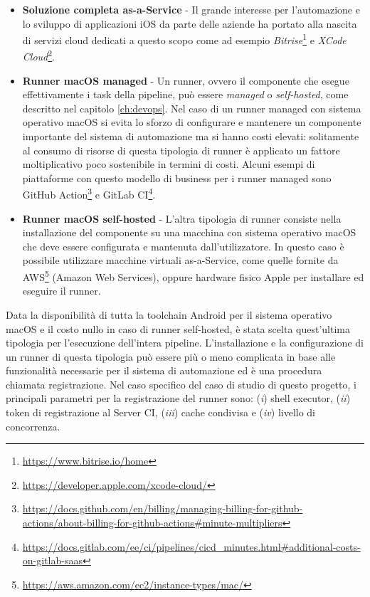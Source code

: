 \begin{itemize}
    \item \textbf{Soluzione completa as-a-Service} - Il grande interesse per l'automazione e lo sviluppo di applicazioni iOS da parte delle aziende ha portato alla nascita di servizi cloud dedicati a questo scopo come ad esempio \textit{Bitrise}\footnote{\href{https://www.bitrise.io/home}{https://www.bitrise.io/home}} e \textit{XCode Cloud}\footnote{\href{https://developer.apple.com/xcode-cloud/}{https://developer.apple.com/xcode-cloud/}}.
    \item \textbf{Runner macOS managed} - Un runner, ovvero il componente che esegue effettivamente i task della pipeline, può essere \textit{managed} o \textit{self-hosted}, come descritto nel capitolo \ref{ch:devops}. Nel caso di un runner managed con sistema operativo macOS si evita lo sforzo di configurare e mantenere un componente importante del sistema di automazione ma si hanno costi elevati: solitamente al consumo di risorse di questa tipologia di runner è applicato un fattore moltiplicativo poco sostenibile in termini di costi. Alcuni esempi di piattaforme con questo modello di business per i runner managed sono GitHub Action\footnote{\href{https://docs.github.com/en/billing/managing-billing-for-github-actions/about-billing-for-github-actions\#minute-multipliers}{https://docs.github.com/en/billing/managing-billing-for-github-actions/about-billing-for-github-actions\#minute-multipliers}} e GitLab CI\footnote{\href{https://docs.gitlab.com/ee/ci/pipelines/cicd\_minutes.html\#additional-costs-on-gitlab-saas}{https://docs.gitlab.com/ee/ci/pipelines/cicd\_minutes.html\#additional-costs-on-gitlab-saas}}.
    \item \textbf{Runner macOS self-hosted} - L'altra tipologia di runner consiste nella installazione del componente su una macchina con sistema operativo macOS che deve essere configurata e mantenuta dall'utilizzatore. In questo caso è possibile utilizzare macchine virtuali as-a-Service, come quelle fornite da AWS\footnote{\href{https://aws.amazon.com/ec2/instance-types/mac/}{https://aws.amazon.com/ec2/instance-types/mac/}} (Amazon Web Services), oppure hardware fisico Apple per installare ed eseguire il runner.
\end{itemize}

Data la disponibilità di tutta la toolchain Android per il sistema operativo macOS e il costo nullo in caso di runner self-hosted, è stata scelta quest'ultima tipologia per l'esecuzione dell'intera pipeline. L'installazione e la configurazione di un runner di questa tipologia può essere più o meno complicata in base alle funzionalità necessarie per il sistema di automazione ed è una procedura chiamata registrazione. Nel caso specifico del caso di studio di questo progetto, i principali parametri per la registrazione del runner sono: (\textit{i}) shell executor, (\textit{ii}) token di registrazione al Server CI, (\textit{iii}) cache condivisa e (\textit{iv}) livello di concorrenza.

